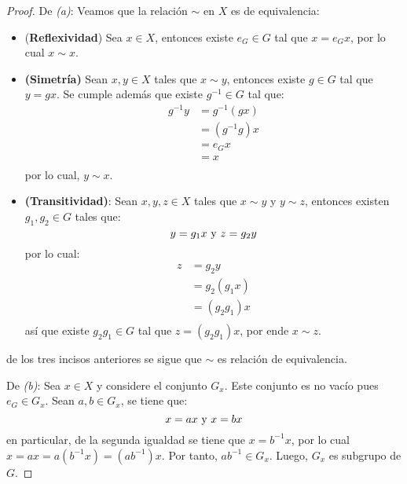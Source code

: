 \documentclass[12pt]{report}
\newcounter{it}
\theoremstyle{largebreak}
\begin{document}
    \begin{proof}
        De \textit{(a)}: Veamos que la relación $\sim$ en $X$ es de equivalencia:
        \begin{itemize}
            \item (\textbf{Reflexividad}) Sea $x\in X$, entonces existe $e_G\in G$ tal que $x=e_Gx$, por lo cual $x\sim x$.
            \item \textbf{(Simetría)} Sean $x,y\in X$ tales que $x\sim y$, entonces existe $g\in G$ tal que $y=gx$. Se cumple además que existe $g^{-1}\in G$ tal que:
            \begin{equation*}
                \begin{split}
                    g^{-1}y&=g^{-1}(gx)\\
                    &=(g^{-1}g)x\\
                    &=e_Gx\\
                    &=x\\
                \end{split}
            \end{equation*}
            por lo cual, $y\sim x$.
            \item \textbf{(Transitividad)}: Sean $x,y,z\in X$ tales que $x\sim y$ y $y\sim z$, entonces existen $g_1,g_2\in G$ tales que:
            \begin{equation*}
                y=g_1x\textup{ y }z=g_2y
            \end{equation*}
            por lo cual:
            \begin{equation*}
                \begin{split}
                    z&=g_2y\\
                    &=g_2(g_1x)\\
                    &=(g_2g_1)x\\
                \end{split}
            \end{equation*}
            así que existe $g_2g_1\in G$ tal que $z=(g_2g_1)x$, por ende $x\sim z$.
        \end{itemize}
        de los tres incisos anteriores se sigue que $\sim$ es relación de equivalencia.

        De \textit{(b)}: Sea $x\in X$ y considere el conjunto $G_x$. Este conjunto es no vacío pues $e_G\in G_x$. Sean $a,b\in G_x$, se tiene que:
        \begin{equation*}
            x=ax\textup{ y }x=bx
        \end{equation*}
        en particular, de la segunda igualdad se tiene que $x=b^{-1}x$, por lo cual $x=ax=a(b^{-1}x)=(ab^{-1})x$. Por tanto, $ab^{-1}\in G_x$. Luego, $G_x$ es subgrupo de $G$.
    \end{proof}
\end{document}
